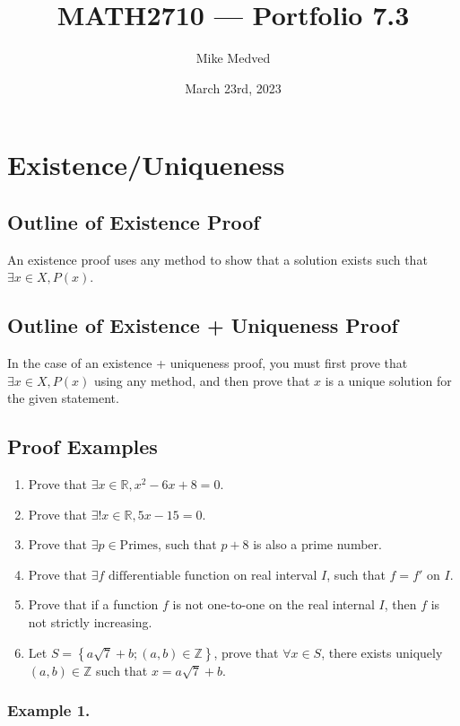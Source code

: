 \documentclass{article}
\title{MATH2710 — Portfolio 7.3}
\author{Mike Medved}
\date{March 23rd, 2023}
\begin{document}
\maketitle

\section*{Existence/Uniqueness}

\subsection*{Outline of Existence Proof}

An existence proof uses any method to show that a solution exists such that $\exists x \in X, P(x)$.

\subsection*{Outline of Existence + Uniqueness Proof}

In the case of an existence + uniqueness proof, you must first prove that $\exists x \in X, P(x)$ using any method, and then prove that $x$ is a unique solution for the given statement.

\subsection*{Proof Examples}

\begin{enumerate}
    \item Prove that $\exists x \in \mathbb{R}, x^2-6x+8=0$.
    \item Prove that $\exists! x \in \mathbb{R}, 5x-15=0$.
    \item Prove that $\exists p \in \text{Primes}$, such that $p+8$ is also a prime number.
    \item Prove that $\exists f \text{ differentiable function}$ on real interval $I$, such that $f = f'$ on $I$.
    \item Prove that if a function $f$ is not one-to-one on the real internal $I$, then $f$ is not strictly increasing.
    \item Let $S = \left\{a\sqrt{7} + b; (a,b) \in \mathbb{Z}\right\}$, prove that $\forall x \in S$, there exists uniquely $(a, b) \in \mathbb{Z}$ such that $x = a\sqrt{7}+b$.
\end{enumerate}

\subsubsection*{Example 1.}
\end{document}
